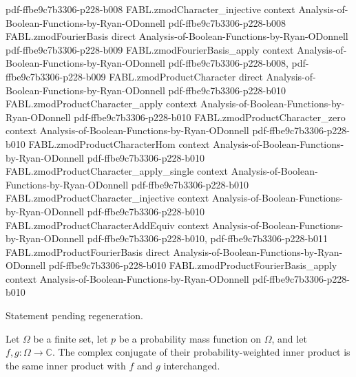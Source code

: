 \begin{theorem}
  {pdf-ffbe9c7b3306-p228-b008}
\proofstep
  {FABL.zmodCharacter_injective}
  {context}
  {Analysis-of-Boolean-Functions-by-Ryan-ODonnell}
  {pdf-ffbe9c7b3306-p228-b008}
\proofstep
  {FABL.zmodFourierBasis}
  {direct}
  {Analysis-of-Boolean-Functions-by-Ryan-ODonnell}
  {pdf-ffbe9c7b3306-p228-b009}
\proofstep
  {FABL.zmodFourierBasis_apply}
  {context}
  {Analysis-of-Boolean-Functions-by-Ryan-ODonnell}
  {pdf-ffbe9c7b3306-p228-b008,
    pdf-ffbe9c7b3306-p228-b009}
\proofstep
  {FABL.zmodProductCharacter}
  {direct}
  {Analysis-of-Boolean-Functions-by-Ryan-ODonnell}
  {pdf-ffbe9c7b3306-p228-b010}
\proofstep
  {FABL.zmodProductCharacter_apply}
  {context}
  {Analysis-of-Boolean-Functions-by-Ryan-ODonnell}
  {pdf-ffbe9c7b3306-p228-b010}
\proofstep
  {FABL.zmodProductCharacter_zero}
  {context}
  {Analysis-of-Boolean-Functions-by-Ryan-ODonnell}
  {pdf-ffbe9c7b3306-p228-b010}
\proofstep
  {FABL.zmodProductCharacterHom}
  {context}
  {Analysis-of-Boolean-Functions-by-Ryan-ODonnell}
  {pdf-ffbe9c7b3306-p228-b010}
\proofstep
  {FABL.zmodProductCharacter_apply_single}
  {context}
  {Analysis-of-Boolean-Functions-by-Ryan-ODonnell}
  {pdf-ffbe9c7b3306-p228-b010}
\proofstep
  {FABL.zmodProductCharacter_injective}
  {context}
  {Analysis-of-Boolean-Functions-by-Ryan-ODonnell}
  {pdf-ffbe9c7b3306-p228-b010}
\proofstep
  {FABL.zmodProductCharacterAddEquiv}
  {context}
  {Analysis-of-Boolean-Functions-by-Ryan-ODonnell}
  {pdf-ffbe9c7b3306-p228-b010,
    pdf-ffbe9c7b3306-p228-b011}
\proofstep
  {FABL.zmodProductFourierBasis}
  {direct}
  {Analysis-of-Boolean-Functions-by-Ryan-ODonnell}
  {pdf-ffbe9c7b3306-p228-b010}
\proofstep
  {FABL.zmodProductFourierBasis_apply}
  {context}
  {Analysis-of-Boolean-Functions-by-Ryan-ODonnell}
  {pdf-ffbe9c7b3306-p228-b010}

Statement pending regeneration.
\end{theorem}

\begin{theorem}
\label{FABL.ComplexFourierSystem.pmfComplexInner_conj_symm}
\leanok
{}
Let $Ω$ be a finite set, let $p$ be a probability mass function on $Ω$, and let
$f,g:Ω\to\mathbb C$. The complex conjugate of their probability-weighted inner product
is the same inner product with $f$ and $g$ interchanged.
\end{theorem}

